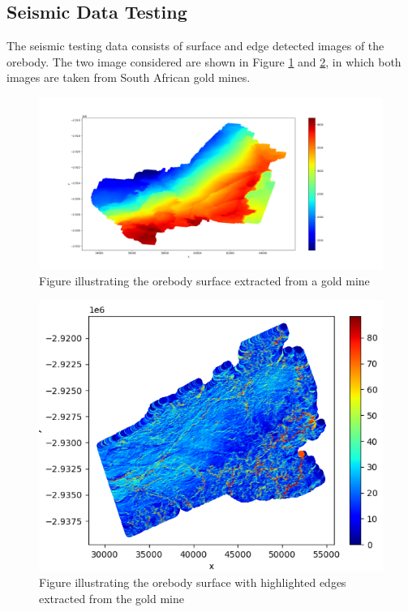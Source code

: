 \documentclass[preprint,12pt]{elsarticle}
\begin{document}
\subsection{Seismic Data Testing}
The seismic testing data consists of surface and edge detected images
of the orebody. The two image considered are shown in
Figure \ref{fig:orebody_surface_earth} and \ref{fig:highlighted_gold_mine},
in which both images are taken from South African gold mines.

\begin{figure}
    \centering
    \includegraphics[width=\textwidth]{images/Orebody-surface_EarthVision_Gri.png}
    \caption{Figure illustrating the orebody surface extracted from a gold mine}
    \label{fig:orebody_surface_earth}
\end{figure}

\begin{figure}
    \centering
    \includegraphics[width=\textwidth]{images/highlighted_orebody.png}
    \caption{Figure illustrating the orebody surface with highlighted edges extracted
        from the gold mine}
    \label{fig:highlighted_gold_mine}
\end{figure}
\end{document}
